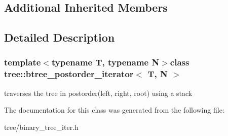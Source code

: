 \subsection*{Additional Inherited Members}


\subsection{Detailed Description}
\subsubsection*{template$<$typename T, typename N$>$class tree\-::btree\-\_\-postorder\-\_\-iterator$<$ T, N $>$}

traverses the tree in postorder(left, right, root) using a stack 

The documentation for this class was generated from the following file\-:\begin{DoxyCompactItemize}
\item 
tree/binary\-\_\-tree\-\_\-iter.\-h\end{DoxyCompactItemize}
